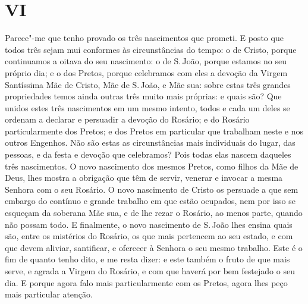 \section*{VI}

Parece"-me que tenho provado os três nascimentos que
prometi. E posto que todos três sejam mui conformes às circunstâncias do
tempo: o de Cristo, porque continuamos a oitava do seu nascimento: o de
S.\,João, porque estamos no seu próprio dia; e o dos Pretos, porque
celebramos com eles a devoção da Virgem Santíssima Mãe de Cristo, Mãe de
S.\,João, e Mãe sua: sobre estas três grandes propriedades temos ainda
outras três muito mais próprias: e quais são? Que unidos estes três
nascimentos em um mesmo intento, todos e cada um deles se ordenam a
declarar e persuadir a devoção do Rosário; e do Rosário particularmente
dos Pretos; e dos Pretos em particular que trabalham neste e nos outros
Engenhos. Não são estas as circunstâncias mais individuais do lugar, das
pessoas, e da festa e devoção que celebramos? Pois todas elas nascem
daqueles três nascimentos. O novo nascimento dos mesmos Pretos, como
filhos da Mãe de Deus, lhes mostra a obrigação que têm de servir,
venerar e invocar a mesma Senhora com o seu Rosário. O novo nascimento
de Cristo os persuade a que sem embargo do contínuo e grande trabalho em
que estão ocupados, nem por isso se esqueçam da soberana Mãe sua, e de
lhe rezar o Rosário, ao menos parte, quando não possam todo. E
finalmente, o novo nascimento de S.\,João lhes ensina quais são, entre os
mistérios do Rosário, os que mais pertencem ao seu estado, e com que
devem aliviar, santificar, e oferecer à Senhora o seu mesmo trabalho.
Este é o fim de quanto tenho dito, e me resta dizer: e este também o
fruto de que mais serve, e agrada a Virgem do Rosário, e com que haverá
por bem festejado o seu dia. E porque agora falo mais particularmente
com os Pretos, agora lhes peço mais particular atenção.

